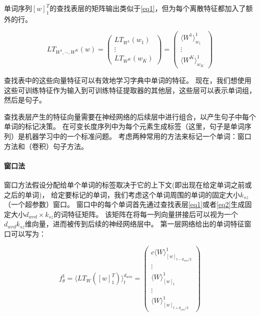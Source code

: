 单词序列$[w]_1^T$的查找表层的矩阵输出类似于\ref{eq1}，但为每个离散特征都加入了额外的行。

\begin{equation}\label{eq2}
	LT_{W^1, \cdots, W^K}(w) = 
		\left(\begin{matrix}
			LT_{W^1}(w_1) \\
			\vdots \\
			LT_{W^K}(w_K)
		\end{matrix}\right) =
		\left(\begin{matrix}
			\langle W^1\rangle _{w_1}^1 \\
			\vdots \\
			\langle W^K\rangle _{w_K}^1
		\end{matrix}\right)
	\end{equation}

查找表中的这些向量特征可以有效地学习字典中单词的特征。
现在，我们想使用这些可训练特征作为输入到可训练特征提取器的其他层，这些层可以表示单词组，然后是句子。

查找表层产生的特征向量需要在神经网络的后续层中进行组合，以产生句子中每个单词的标记决策。
在可变长度序列中为每个元素生成标签（这里，句子是单词序列）是机器学习中的一个标准问题。
考虑两种常用的方法来标记一个单词：窗口方法和（卷积）句子方法。

\paragraph{窗口法}

窗口方法假设分配给单个单词的标签取决于它的上下文(即出现在给定单词之前或之后的单词)，
给定要标记的单词，我们考虑这个单词周围的单词的固定大小$k_{sz}$（一个超参数）窗口。
窗口中的每个单词首先通过查找表层\ref{eq1}或者\ref{eq2}生成固定大小$d_{wrd}\times k_{sz}$的词特征矩阵。
该矩阵在将每一列向量拼接后可以视为一个$d_{wrd} k_{sz}$维向量，进而被传到后续的神经网络层中。
第一层网络给出的单词特征窗口可以写为：

\begin{equation}
	f^{1}_{\theta}
	= \langle LT_W( [ w ] ^T_1) \rangle ^{d_{win}}_t
	= \left(
			\begin{matrix}{c}
			\langle W \rangle ^1_{[w]_{t - d_{win} / 2}} \\
			\vdots \\
			\langle W \rangle ^1_{[w]_t} \\
			\vdots \\
			\langle W \rangle ^1_{[w]_{t + d_{win} / 2}}
		\end{matrix}
	\right)
\end{equation}

